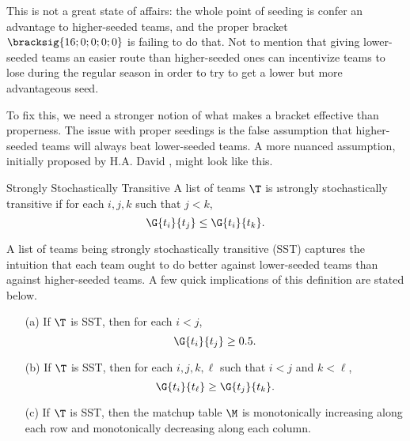 {This is not a great state of affairs: the whole point of seeding is confer an advantage to higher-seeded teams, and the proper bracket $\bracksig{16; 0; 0; 0; 0}$ is failing to do that. Not to mention that giving lower-seeded teams an easier route than higher-seeded ones can incentivize teams to lose during the regular season in order to try to get a lower but more advantageous seed.

To fix this, we need a stronger notion of what makes a bracket effective than properness. The issue with proper seedings is the false assumption that higher-seeded teams will always beat lower-seeded teams. A more nuanced assumption, initially proposed by H.A. David \cite{stochastic}, might look like this.

\begin{definition}{Strongly Stochastically Transitive}{}
    A list of teams $\T$ is \i{strongly stochastically transitive} if for each $i, j, k$ such that $j < k$, $$\G{t_i}{t_j} \leq \G{t_i}{t_k}.$$
\end{definition}

A list of teams being strongly stochastically transitive (SST) captures the intuition that each team ought to do better against lower-seeded teams than against higher-seeded teams. A few quick implications of this definition are stated below.

\begin{corollary}{}{}
    \begin{enumerate}
        \item[(a)] If $\T$ is SST, then for each $i < j$, $$\G{t_i}{t_j} \geq 0.5.$$
        \item[(b)] If $\T$ is SST, then for each $i, j, k, \ell$ such that $i < j$ and $k < \ell$, $$\G{t_i}{t_\ell} \geq \G{t_j}{t_k}.$$
        \item[(c)] If $\T$ is SST, then the matchup table $\M$ is monotonically increasing along each row and monotonically decreasing along each column.
    \end{enumerate}
    \end{corollary}



}
